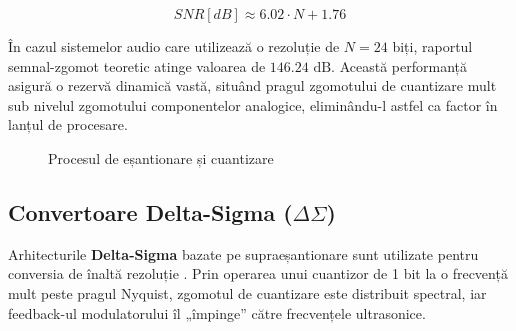 \begin{equation}
    SNR [dB] \approx 6.02 \cdot N + 1.76
    \label{eq:snr_quantization}
\end{equation}

În cazul sistemelor audio care utilizează o rezoluție de $N=24$ biți, raportul semnal-zgomot teoretic atinge valoarea de $146.24\text{ dB}$. Această performanță asigură o rezervă dinamică vastă, situând pragul zgomotului de cuantizare mult sub nivelul zgomotului componentelor analogice, eliminându-l astfel ca factor în lanțul de procesare.

\begin{figure}[H]
    \centering
    \caption{Procesul de eșantionare și cuantizare}
    \label{fig:sampling}
\end{figure}

\subsection{Convertoare Delta-Sigma (\texorpdfstring{$\Delta\Sigma$}{Delta-Sigma})}
Arhitecturile \textbf{Delta-Sigma} bazate pe supraeșantionare sunt utilizate pentru conversia de înaltă rezoluție \cite{zolzer2011dafx}. Prin operarea unui cuantizor de 1 bit la o frecvență mult peste pragul Nyquist, zgomotul de cuantizare este distribuit spectral, iar feedback-ul modulatorului îl „împinge” către frecvențele ultrasonice.

